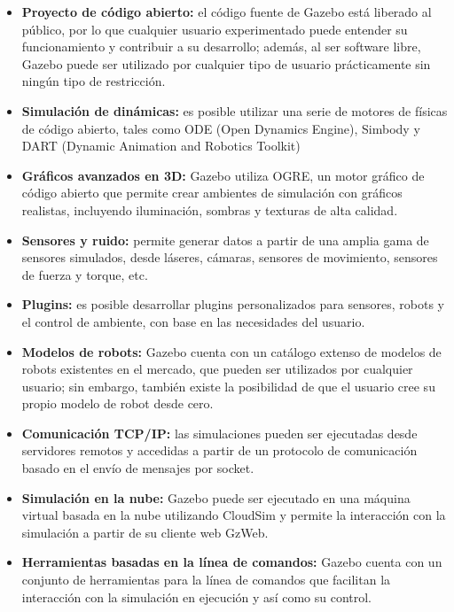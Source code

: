 \begin{itemize}
    \item \textbf{Proyecto de código abierto:} el código fuente de Gazebo está liberado al público, por lo que cualquier usuario experimentado puede entender su funcionamiento y contribuir a su desarrollo; además, al ser software libre, Gazebo puede ser utilizado por cualquier tipo de usuario prácticamente sin ningún tipo de restricción. 
    \item \textbf{Simulación de dinámicas:} es posible utilizar una serie de motores de físicas de código abierto, tales como ODE (Open Dynamics Engine), Simbody y DART (Dynamic Animation and Robotics Toolkit)
    \item \textbf{Gráficos avanzados en 3D:} Gazebo utiliza OGRE, un motor gráfico de código abierto que permite crear ambientes de simulación con gráficos realistas, incluyendo iluminación, sombras y texturas de alta calidad.
    \item \textbf{Sensores y ruido:} permite generar datos a partir de una amplia gama de sensores simulados, desde láseres, cámaras, sensores de movimiento, sensores de fuerza y torque, etc.
    \item \textbf{Plugins:} es posible desarrollar plugins personalizados para sensores, robots y el control de ambiente, con base en las necesidades del usuario. 
    \item \textbf{Modelos de robots:} Gazebo cuenta con un catálogo extenso de modelos de robots existentes en el mercado, que pueden ser utilizados por cualquier usuario; sin embargo, también existe la posibilidad de que el usuario cree su propio modelo de robot desde cero. 
    \item \textbf{Comunicación TCP/IP:} las simulaciones pueden ser ejecutadas desde servidores remotos y accedidas a partir de un protocolo de comunicación basado en el envío de mensajes por socket.
    \item \textbf{Simulación en la nube:} Gazebo puede ser ejecutado en una máquina virtual basada en la nube utilizando CloudSim y permite la interacción con la simulación a partir de su cliente web GzWeb.
    \item \textbf{Herramientas basadas en la línea de comandos:} Gazebo cuenta con un conjunto de herramientas para la línea de comandos que facilitan la interacción con la simulación en ejecución y así como su control.
\end{itemize}







